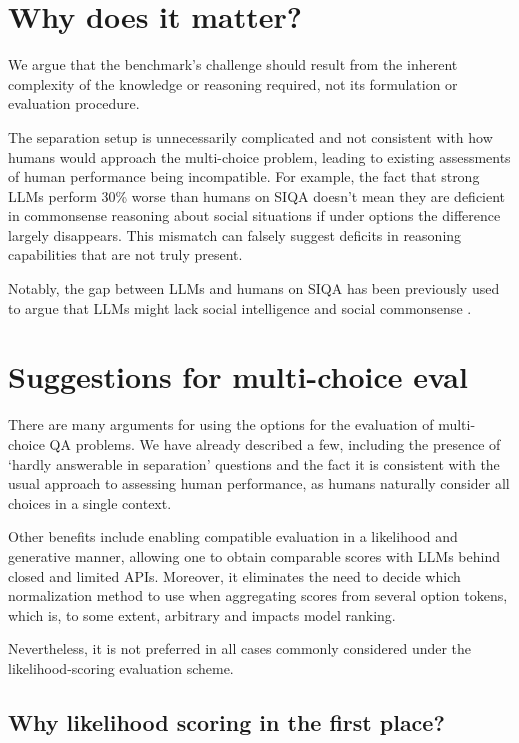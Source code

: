 \documentclass[11pt]{article}
\DeclareRobustCommand{\shl}[3]{
  \begingroup\setlength{\fboxsep}{2pt}%
  \colorbox{#1}{{\hspace*{2pt}\vphantom{Ay}#2\hspace*{2pt}}}%
  \endgroup
}
\begin{document}
\section{Why does it matter?}

We argue that the benchmark's challenge should result from the inherent complexity of the knowledge or reasoning required, not its formulation or evaluation procedure.

The \shl{separation}{separation}{} setup is unnecessarily complicated and not consistent with how humans would approach the multi-choice problem, leading to existing assessments of human performance being incompatible. For example, the fact that strong LLMs perform 30\% worse than humans on SIQA doesn't mean they are deficient in commonsense reasoning about social situations if under \shl{all}{options}{} the difference largely disappears. This mismatch can falsely suggest deficits in reasoning capabilities that are not truly present.

Notably, the gap between LLMs and humans on SIQA has been previously used to argue that LLMs might lack social intelligence and social commonsense \cite{sap-etal-2022-neural}.

\section{Suggestions for multi-choice eval}

There are many arguments for using the \shl{all}{options}{} for the evaluation of multi-choice QA problems. We have already described a few, including the presence of `hardly answerable in separation' questions and the fact it is consistent with the usual approach to assessing human performance, as humans naturally consider all choices in a single context. %

Other benefits include enabling compatible evaluation in a likelihood and generative manner, allowing one to obtain comparable scores with LLMs behind closed and limited APIs. Moreover, it eliminates the need to decide which normalization method to use when aggregating scores from several option tokens, which is, to some extent, arbitrary and impacts model ranking. 

Nevertheless, it is not preferred in all cases commonly considered under the likelihood-scoring evaluation scheme.

\subsection{Why likelihood scoring in the first place?}
\end{document}
